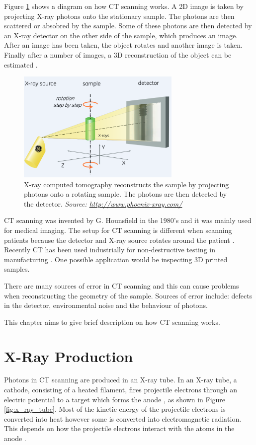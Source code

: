 \documentclass[12pt]{report}
\begin{document}
Figure \ref{fig:x_ray_ct} shows a diagram on how CT scanning works. A 2D image is taken by projecting X-ray photons onto the stationary sample. The photons are then scattered or absobred by the sample.  Some of these photons are then detected by an X-ray detector on the other side of the sample, which produces an image. After an image has been taken, the object rotates and another image is taken. Finally after a number of images, a 3D reconstruction of the object can be estimated \cite{cantatore2011introduction}.

\begin{figure}
\centering
\includegraphics[width=0.7\textwidth]{figures/x_ray_ct.png}
\caption{X-ray computed tomography reconstructs the sample by projecting photons onto a rotating sample. The photons are then detected by the detector. \emph{Source: \url{http://www.phoenix-xray.com/}}}
\label{fig:x_ray_ct}
\end{figure}

CT scanning was invented by G. Hounsfield \cite{hounsfield1980computed} in the 1980's and it was mainly used for medical imaging. The setup for CT scanning is different when scanning patients because the detector and X-ray source rotates around the patient \cite{cantatore2011introduction}. Recently CT has been used industrially for non-destructive testing in manufacturing \cite{cantatore2011introduction}. One possible application would be inspecting 3D printed samples.

There are many sources of error in CT scanning \cite{cantatore2011introduction} and this can cause problems when reconstructing the geometry of the sample. Sources of error include: defects in the detector, environmental noise and the behaviour of photons.

This chapter aims to give brief description on how CT scanning works.

\section{X-Ray Production}
Photons in CT scanning are produced in an X-ray tube. In an X-ray tube, a cathode, consisting of a heated filament, fires projectile electrons through an electric potential to a target which forms the anode \cite{michael2001x}, as shown in Figure \ref{fig:x_ray_tube}. Most of the kinetic energy of the projectile electrons is converted into heat however some is converted into electromagnetic radiation. This depends on how the projectile electrons interact with the atoms in the anode \cite{cantatore2011introduction}.
\end{document}
